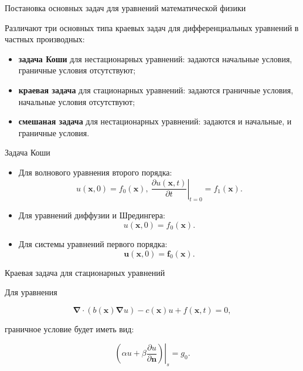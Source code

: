\documentclass[10pt,xcolor=pst,aspectratio=169]{beamer}
\begin{document}
\begin{frame}{Постановка основных задач для уравнений математической физики}

    \transdissolve[duration=0.1]
    \justifying
    \large

    Различают три основных типа краевых задач для дифференциальных уравнений в частных производных:

    \begin{itemize}
        \item \textbf{задача Коши} для нестационарных уравнений: задаются начальные условия, граничные условия отсутствуют;

        \item \textbf{краевая задача} для стационарных уравнений: задаются граничные условия, начальные условия отсутствуют;

        \item \textbf{смешаная задача} для нестационарных уравнений: задаются и начальные, и граничные условия.
    \end{itemize}

\end{frame}

\begin{frame}{Задача Коши}

    \transdissolve[duration=0.1]
    \justifying
    \large

    \begin{itemize}
        \item Для волнового уравнения второго порядка:
            \[
                u(\mathbf{x}, 0) = f_{0}(\mathbf{x}), \: \left. \frac{\partial u(\mathbf{x}, t)}{\partial t} \right|_{t = 0}= f_{1}(\mathbf{x}).
            \]

        \item Для уравнений диффузии и Шредингера:
            \[
                u(\mathbf{x}, 0) = f_{0}(\mathbf{x}).
            \]

        \item Для системы уравнений первого порядка:
            \[
                \mathbf{u}(\mathbf{x}, 0) = \mathbf{f}_{0}(\mathbf{x}).
            \]
    \end{itemize}

\end{frame}

\begin{frame}{Краевая задача для стационарных уравнений}

    \transdissolve[duration=0.1]
    \justifying
    \large

    Для уравнения 

    \[
        \bm{\nabla} \cdot \left( b(\mathbf{x}) \bm{\nabla} u \right) - c(\mathbf{x}) u + f(\mathbf{x}, t) = 0,
    \]

    граничное условие будет иметь вид:

    \[
        \left. \left( \alpha u + \beta \frac{\partial u}{\partial \mathbf{n}} \right) \right|_{s} = g_{0}.
    \]

\end{frame}
\end{document}
